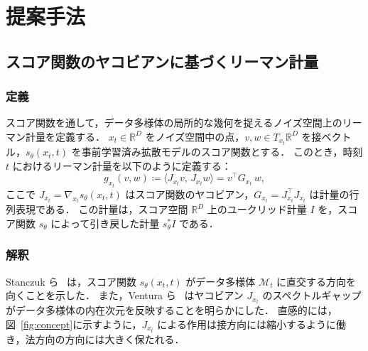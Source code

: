 \documentclass[MIRU,submit]{miru2026j}
\theoremstyle{definition}
\begin{document}

\section{提案手法}

\subsection{スコア関数のヤコビアンに基づくリーマン計量}

\subsubsection{定義} %
スコア関数を通して，データ多様体の局所的な幾何を捉えるノイズ空間上のリーマン計量を定義する．
$x_t \in \mathbb{R}^D$ をノイズ空間中の点，$v, w \in T_{x_t}\mathbb{R}^D$ を接ベクトル，$s_\theta(x_t, t)$ を事前学習済み拡散モデルのスコア関数とする．
このとき，時刻 $t$ におけるリーマン計量を以下のように定義する：
\begin{equation}
    \textstyle
    \label{eq:jacobian_metric}
    g_{x_t}(v, w) \coloneqq \langle J_{x_t} v,\, J_{x_t} w \rangle = v^\top G_{x_t}\, w, 
\end{equation}
ここで $J_{x_t} = \nabla_{x_t} s_\theta(x_t, t)$ はスコア関数のヤコビアン，$G_{x_t} = J_{x_t}^\top J_{x_t}$ は計量の行列表現である．
この計量は，スコア空間 $\mathbb{R}^D$ 上のユークリッド計量 $I$ を，スコア関数 $s_\theta$ によって引き戻した計量 $s_\theta^* I$ である．

\subsubsection{解釈}
Stanczuk ら~\cite{Stanczuk2024} は，スコア関数 $s_\theta(x_t, t)$ がデータ多様体 $\mathcal{M}_t$ に直交する方向を向くことを示した．
また，Ventura ら~\cite{Ventura2025} はヤコビアン $J_{x_t}$ のスペクトルギャップがデータ多様体の内在次元を反映することを明らかにした．
直感的には，図~\ref{fig:concept}に示すように，$J_{x_t}$ による作用は接方向には縮小するように働き，法方向の方向には大きく保たれる．
\end{document}
